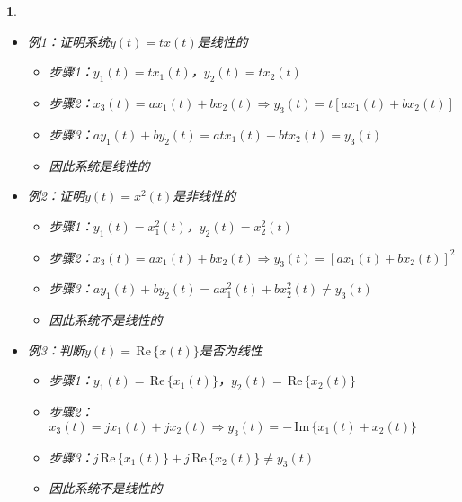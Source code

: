 \documentclass[UTF8]{report}
\def\Im{\mathrm{\,Im\,}}
\def\Re{\mathrm{\,Re\,}}
\theoremstyle{MyLineTheoremStyle} %
\theoremstyle{MyBlockTheoremStyle} %
\theoremstyle{MySubsubsectionStyle} %
\newtheorem{definition}{}
\begin{document}
\begin{definition}
\begin{itemize}
        叠加性：如果系统对信号$x_k(t)$的响应为$y_k(t)$，$k=1,2,3,\ldots$，那么系统对信号$x(t) = \sum_{k} x_k(t)$的响应$y(t)$为
        \[
        y(t) = \sum_{k} y_k(t)
        \]
        离散时间线性系统同上

        判断一个系统“$\rightarrow$”是否线性系统的一般性步骤（$a, b, x(t), y(t)$可为复数）：
        \begin{enumerate}
            \item $x_1(t) \rightarrow y_1(t)$，$x_2(t) \rightarrow y_2(t)$
            \item 设$x_3(t) = a x_1(t) + b x_2(t) \rightarrow y_3(t)$
            \item 如果$y_3(t) = a y_1(t) + b y_2(t)$，则系统为线性的
        \end{enumerate}
        本质利用“线性”的定义

        \item 例1：证明系统$y(t) = t x(t)$是线性的
        \begin{itemize}
            \item 步骤1：$y_1(t) = t x_1(t)$，$y_2(t) = t x_2(t)$
            \item 步骤2：$x_3(t) = a x_1(t) + b x_2(t) \Rightarrow y_3(t) = t [a x_1(t) + b x_2(t)]$
            \item 步骤3：$a y_1(t) + b y_2(t) = a t x_1(t) + b t x_2(t) = y_3(t)$
            \item 因此系统是线性的
        \end{itemize}

        \item 例2：证明$y(t) = x^2(t)$是非线性的
        \begin{itemize}
            \item 步骤1：$y_1(t) = x_1^2(t)$，$y_2(t) = x_2^2(t)$
            \item 步骤2：$x_3(t) = a x_1(t) + b x_2(t) \Rightarrow y_3(t) = [a x_1(t) + b x_2(t)]^2$
            \item 步骤3：$a y_1(t) + b y_2(t) = a x_1^2(t) + b x_2^2(t) \neq y_3(t)$
            \item 因此系统不是线性的
        \end{itemize}

        \item 例3：判断$y(t) = \Re\{x(t)\}$是否为线性
        \begin{itemize}
            \item 步骤1：$y_1(t) = \Re\{x_1(t)\}$，$y_2(t) = \Re\{x_2(t)\}$
            \item 步骤2：$x_3(t) = j x_1(t) + j x_2(t) \Rightarrow y_3(t) = -\Im\{x_1(t) + x_2(t)\}$
            \item 步骤3：$j \Re\{x_1(t)\} + j \Re\{x_2(t)\} \neq y_3(t)$
            \item 因此系统不是线性的
        \end{itemize}


\end{itemize}
\end{definition}
\end{document}

